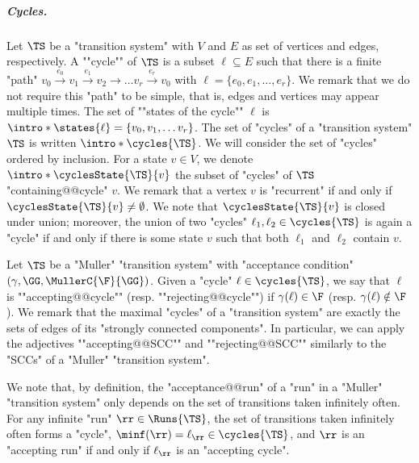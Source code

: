 \documentclass[10pt,a4paper]{amsart}
\renewcommand{\gg}{\gamma}
\newcommand{\re}[1]{\xrightarrow{#1}}
\begin{document}
\subparagraph*{Cycles.} Let $\TS$ be a "transition system" with $V$ and $E$ as set of vertices and edges, respectively. A ""cycle"" of $\TS$ is a subset $\ell \subseteq E$ such that there is a finite "path" $v_0 \re {e_0}v_1 \re {e_1}v_2 \re{} \dots v_r \re {e_r} v_0$ with $\ell = \{e_0, e_1, \dots, e_r\}$. 
We remark that we do not require this "path" to be simple, that is, edges and vertices may appear multiple times. 
\AP The set of ""states of the cycle"" $\ell$ is $\intro*\states{\ell} = \{v_0, v_1, \dots v_r\}$. 
\AP The set of "cycles" of a "transition system" $\TS$ is written $\intro*\cycles{\TS}$. 
We will consider the set of "cycles" ordered by inclusion.
\AP For a state $v\in V$, we denote $\intro*\cyclesState{\TS}{v}$ the subset of "cycles" of $\TS$ "containing@@cycle" $v$.
We remark that a vertex $v$ is "recurrent" if and only if $\cyclesState{\TS}{v}\neq \emptyset$.
We note that $\cyclesState{\TS}{v}$ is closed under union; moreover, the union of two "cycles" $\ell_1, \ell_2\in \cycles{\TS}$ is again a "cycle" if and only if there is some state $v$ such that both $\ell_1$ and $\ell_2$ contain $v$.


Let $\TS$ be a "Muller" "transition system" with "acceptance condition" $(\gg, \GG, \MullerC{\F}{\GG})$.
\AP Given a "cycle" $\ell\in \cycles{\TS}$, we say that $\ell$ is ""accepting@@cycle"" (resp. ""rejecting@@cycle"") if $\gg(\ell) \in \F$ (resp. $\gg(\ell) \notin \F$). %
We remark that the maximal "cycles" of a "transition system" are exactly the sets of edges of its "strongly connected components". In particular, we can apply the adjectives ""accepting@@SCC"" and ""rejecting@@SCC"" similarly to the "SCCs" of a "Muller" "transition system".

We note that, by definition, the "acceptance@@run" of a "run" in a "Muller" "transition system" only depends on the set of transitions taken infinitely often. For any infinite "run" $\rr \in \Runs{\TS}$, the set of transitions taken infinitely often forms a "cycle", $\minf(\rr) = \ell_\rr\in \cycles{\TS}$, and $\rr$ is an "accepting run" if and only if $\ell_\rr$ is an "accepting cycle". 
\end{document}
